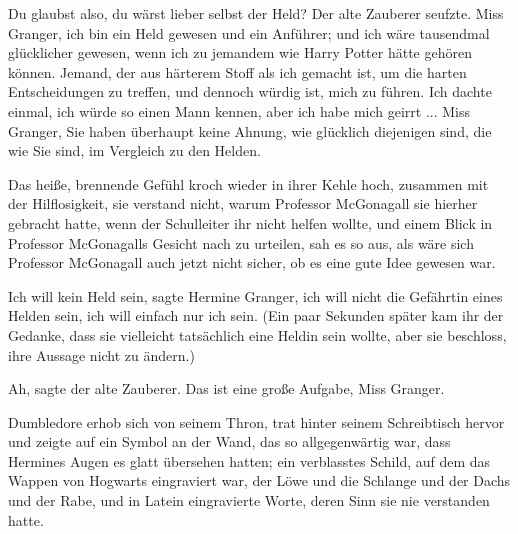 \glqq{}Du glaubst also, du wärst lieber selbst der Held?\grqq{} Der alte Zauberer
seufzte. \glqq{}Miss Granger, ich bin ein Held gewesen und ein Anführer; und ich
wäre tausendmal glücklicher gewesen, wenn ich zu jemandem wie Harry Potter hätte
gehören können. Jemand, der aus härterem Stoff als ich gemacht ist, um die
harten Entscheidungen zu treffen, und dennoch würdig ist, mich zu führen. Ich
dachte einmal, ich würde so einen Mann kennen, aber ich habe mich geirrt ... Miss
Granger, Sie haben überhaupt keine Ahnung, wie glücklich diejenigen sind, die
wie Sie sind, im Vergleich zu den Helden.\grqq{}

Das heiße, brennende Gefühl kroch wieder in ihrer Kehle hoch, zusammen mit der
Hilflosigkeit, sie verstand nicht, warum Professor McGonagall sie hierher
gebracht hatte, wenn der Schulleiter ihr nicht helfen wollte, und einem Blick in
Professor McGonagalls Gesicht nach zu urteilen, sah es so aus, als wäre sich
Professor McGonagall auch jetzt nicht sicher, ob es eine gute Idee gewesen war.

\glqq{}Ich will kein Held sein\grqq{}, sagte Hermine Granger, \glqq{}ich will
nicht die Gefährtin eines Helden sein, ich will einfach nur ich sein.\grqq{}
(Ein paar Sekunden später kam ihr der Gedanke, dass sie vielleicht tatsächlich
eine Heldin sein wollte, aber sie beschloss, ihre Aussage nicht zu ändern.)

\glqq{}Ah\grqq{}, sagte der alte Zauberer. \glqq{}Das ist eine große Aufgabe, Miss
Granger.\grqq{}

Dumbledore erhob sich von seinem Thron, trat hinter seinem Schreibtisch hervor
und zeigte auf ein Symbol an der Wand, das so allgegenwärtig war, dass Hermines
Augen es glatt übersehen hatten; ein verblasstes Schild, auf dem das Wappen von
Hogwarts eingraviert war, der Löwe und die Schlange und der Dachs und der Rabe,
und in Latein eingravierte Worte, deren Sinn sie nie verstanden hatte.


